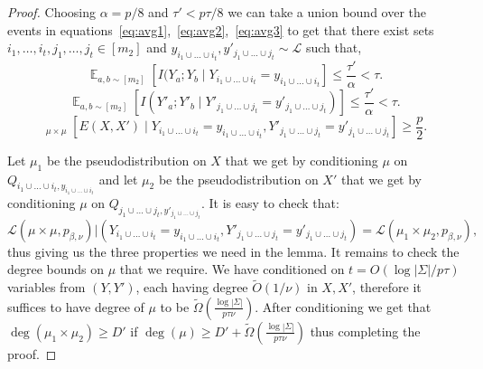 \documentclass[11pt]{article}
\DeclareMathOperator*{\E}{\mathbb{E}}
\DeclareMathOperator*{\pE}{\widetilde{\mathbb{E}}}
\def \cL {\mathcal{L}}
\def \tO {\widetilde{O}}
\theoremstyle{definition}
\begin{document}
\begin{proof}
Choosing $\alpha = p/8$ and $\tau' < p\tau/8$ we can take a union bound over the events in equations~\eqref{eq:avg1},~\eqref{eq:avg2},~\eqref{eq:avg3} to get that there exist sets $i_1,\ldots,i_t, j_1,\ldots,j_t \in [m_2]$ and $y_{i_1 \cup \ldots \cup i_t}, y'_{j_1 \cup \ldots \cup j_t} \sim \cL$ such that,   
\[\E_{a,b \sim [m_2]}[I(Y_a ; Y_b \mid Y_{i_1 \cup \ldots \cup i_t} = y_{i_1 \cup \ldots \cup i_t}] \leq \frac{\tau'}{\alpha} < \tau.\]
\[\E_{a,b \sim [m_2]}[I(Y'_a ; Y'_b \mid Y'_{j_1 \cup \ldots \cup j_t} = y'_{j_1 \cup \ldots \cup j_t})] \leq \frac{\tau'}{\alpha} < \tau.
\]
\[\pE_{\mu \times \mu}[E(X,X') \mid Y_{i_1 \cup \ldots \cup i_t} = y_{i_1 \cup \ldots \cup i_t}, Y'_{j_1 \cup \ldots \cup j_t} = y'_{j_1 \cup \ldots \cup j_t}] \geq \frac{p}{2}.\]

Let $\mu_1$ be the pseudodistribution on $X$ that we get by conditioning $\mu$ on $Q_{i_1 \cup \ldots \cup i_t, y_{i_1 \cup \ldots \cup i_t}}$ and let $\mu_2$ be the pseudodistribution on $X'$ that we get by conditioning $\mu$ on $Q_{j_1 \cup \ldots \cup j_t,y'_{j_1 \cup \ldots \cup j_t}}$. It is easy to check that:
\[\cL(\mu \times \mu, p_{\beta,\nu})| (Y_{i_1 \cup \ldots \cup i_t} = y_{i_1 \cup \ldots \cup i_t}, Y'_{j_1 \cup \ldots \cup j_t} = y'_{j_1 \cup \ldots \cup j_t}) = \cL(\mu_1 \times \mu_2, p_{\beta,\nu}),\]
thus giving us the three properties we need in the lemma. It remains to check the degree bounds on $\mu$ that we require. We have conditioned on $t = O(\log |\Sigma|/p\tau)$ variables from $(Y,Y')$, each having degree $\tO(1/\nu)$ in $X,X'$, therefore it suffices to have degree of $\mu$ to be $\widetilde{\Omega}\left(\frac{\log |\Sigma|}{p\tau\nu}\right)$. After conditioning we get that $\deg(\mu_1 \times \mu_2) \geq D'$ if $\deg(\mu) \geq D'+\widetilde{\Omega}\left(\frac{\log |\Sigma|}{p\tau\nu}\right)$ thus completing the proof.
\end{proof}


\end{document}
